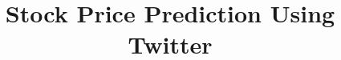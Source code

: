 \documentclass{sig-alternate-05-2015}
\begin{document}






%

\title{ Stock Price Prediction Using Twitter}
%
%
%
%
%
\end{document}
